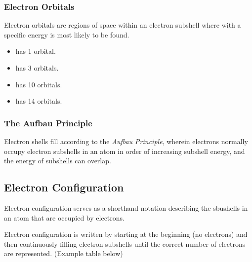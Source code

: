 \subsubsection{Electron Orbitals}

\begin{defn}
Electron orbitals are regions of space within an electron subshell where with a specific energy is most likely to be found.
\end{defn}

\noindent
{}

\begin{multicols}{2}
\begin{itemize}
\item {} has 1 orbital.
\item {} has 3 orbitals.
\item {} has 10 orbitals.
\item {} has 14 orbitals.
\end{itemize}
\end{multicols}

\subsubsection{The Aufbau Principle}

Electron shells fill according to the \textit{Aufbau Principle}, wherein electrons normally occupy electron subshells in an atom in order of increasing subshell energy, and the energy of subshells can overlap.

\subsection{Electron Configuration}

\begin{defn}
Electron configuration serves as a shorthand notation describing the sbushells in an atom that are occupied by electrons.
\end{defn}

\noindent
Electron configuration is written by starting at the beginning (no electrons) and then continuously filling electron subshells until the correct number of electrons are represented. (Example table below)

